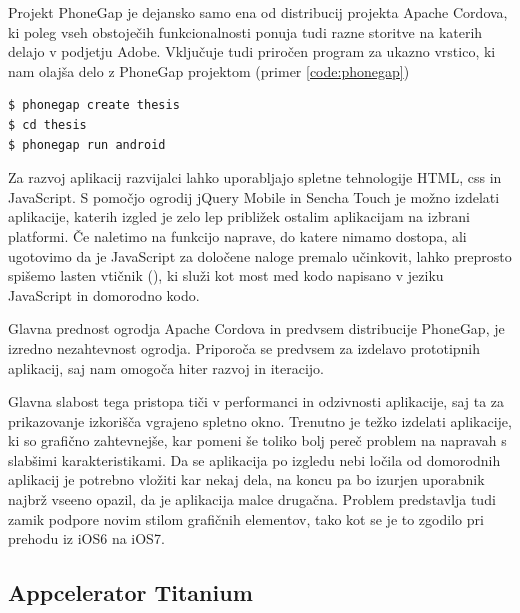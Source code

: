 Projekt PhoneGap\cite{phonegap} je dejansko samo ena od distribucij projekta Apache Cordova, ki poleg vseh obstoječih funkcionalnosti ponuja tudi razne storitve na katerih delajo v podjetju Adobe. Vključuje tudi priročen program za ukazno vrstico, ki nam olajša delo z PhoneGap projektom (primer \ref{code:phonegap})

\begin{lstlisting}[caption=Primer uporabe programa phonegap za ukazno vrstico. Zadnja vrstica zažene pravkar ustvarjeno prazno aplikacijo na android napravi ali emulatorju., label=code:phonegap]
$ phonegap create thesis
$ cd thesis
$ phonegap run android
\end{lstlisting}

Za razvoj aplikacij razvijalci lahko uporabljajo spletne tehnologije HTML, \gls{css} in JavaScript. S pomočjo ogrodij jQuery Mobile\cite{jquerymobile} in Sencha Touch\cite{sencha} je možno izdelati aplikacije, katerih izgled je zelo lep približek ostalim aplikacijam na izbrani platformi. Če naletimo na funkcijo naprave, do katere nimamo dostopa, ali ugotovimo da je JavaScript za določene naloge premalo učinkovit, lahko preprosto spišemo lasten vtičnik (), ki služi kot most med kodo napisano v jeziku JavaScript in domorodno kodo.

Glavna prednost ogrodja Apache Cordova in predvsem distribucije PhoneGap, je izredno nezahtevnost ogrodja. Priporoča se predvsem za izdelavo prototipnih aplikacij, saj nam omogoča hiter razvoj in iteracijo.

Glavna slabost tega pristopa tiči v performanci in odzivnosti aplikacije, saj ta za prikazovanje izkorišča vgrajeno spletno okno. Trenutno je težko izdelati aplikacije, ki so grafično zahtevnejše, kar pomeni še toliko bolj pereč problem na napravah s slabšimi karakteristikami. Da se aplikacija po izgledu nebi ločila od domorodnih aplikacij je potrebno vložiti kar nekaj dela, na koncu pa bo izurjen uporabnik najbrž vseeno opazil, da je aplikacija malce drugačna. Problem predstavlja tudi zamik podpore novim stilom grafičnih elementov, tako kot se je to zgodilo pri prehodu iz iOS6 na iOS7.

\subsection{Appcelerator Titanium}

